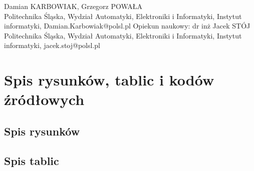 \documentclass[a4paper,12pt]{article}
\begin{document}
\lstset{numbers=left, stepnumber=1, numbersep=10pt, frame=single}
\lstset{frameround=tttt}
\renewcommand{\lstlistlistingname}{\vspace*{-13mm}}
\renewcommand{\listfigurename}{\vspace*{-13mm}}
\renewcommand{\listtablename}{\vspace*{-13mm}}
\renewcommand*{\refname}{\vspace*{-13mm}}
\renewcommand{\lstlistingname}{Kod źródłowy} 

\newcommand{\rowstyle}[1]{\gdef\currentrowstyle{#1}%
#1\ignorespaces
}

\thispagestyle{plain}
\noindent Damian KARBOWIAK, Grzegorz POWAŁA \\
Politechnika Śląska, Wydział Automatyki, Elektroniki i Informatyki, Instytut informatyki, Damian.Karbowiak@polsl.pl
Opiekun naukowy: dr inż Jacek STÓJ
Politechnika Śląska, Wydział Automatyki, Elektroniki i Informatyki, Instytut informatyki, jacek.stoj@polsl.pl



\tableofcontents
{}
\clearpage


\section{Spis rysunków, tablic i kodów źródłowych}
\subsection{Spis rysunków}
\newlength{\fig}
\settowidth{\fig}{Rysunek\,99:~}
\renewcommand*\numberline[1]{\llap{\makebox[\fig][l]{Rysunek\,#1:~}}}
\makeatletter
\renewcommand*\l@figure[2]{\leftskip\fig\noindent#1\par}
\renewcommand*\l@figure{\@dottedtocline{1}{3cm}{0cm}}
\makeatother
\listoffigures

\subsection{Spis tablic}
\settowidth{\fig}{Tablica\,99:~}
\renewcommand*\numberline[1]{\llap{\makebox[\fig][l]{Tablica\,#1:~}}}
\makeatletter
\renewcommand*\l@table[2]{\leftskip\fig\noindent#1\par}
\renewcommand*\l@table{\@dottedtocline{1}{2.8cm}{0cm}}
\makeatother
\listoftables
\end{document}
